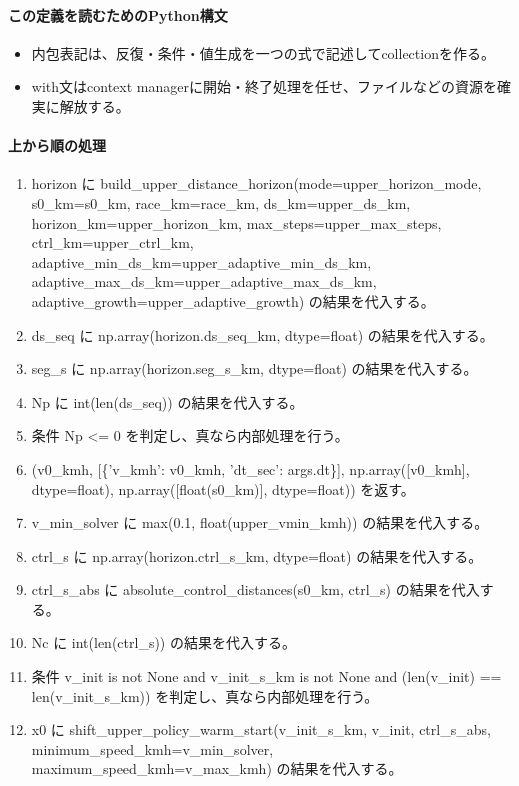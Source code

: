 \documentclass[a4paper,11pt]{article}
\begin{document}
            \paragraph{この定義を読むためのPython構文}
            \begin{itemize}[leftmargin=1.6em]
            \item 内包表記は、反復・条件・値生成を一つの式で記述してcollectionを作る。
\item with文はcontext managerに開始・終了処理を任せ、ファイルなどの資源を確実に解放する。
            \end{itemize}
            \paragraph{上から順の処理}
            \begin{enumerate}[leftmargin=1.8em]
            \item horizon に build\_upper\_distance\_horizon(mode=upper\_horizon\_mode, s0\_km=s0\_km, race\_km=race\_km, ds\_km=upper\_ds\_km, horizon\_km=upper\_horizon\_km, max\_steps=upper\_max\_steps, ctrl\_km=upper\_ctrl\_km, adaptive\_min\_ds\_km=upper\_adaptive\_min\_ds\_km, adaptive\_max\_ds\_km=upper\_adaptive\_max\_ds\_km, adaptive\_growth=upper\_adaptive\_growth) の結果を代入する。
\item ds\_seq に np.array(horizon.ds\_seq\_km, dtype=float) の結果を代入する。
\item seg\_s に np.array(horizon.seg\_s\_km, dtype=float) の結果を代入する。
\item Np に int(len(ds\_seq)) の結果を代入する。
\item 条件 Np <= 0 を判定し、真なら内部処理を行う。
\item   (v0\_kmh, [\{'v\_kmh': v0\_kmh, 'dt\_sec': args.dt\}], np.array([v0\_kmh], dtype=float), np.array([float(s0\_km)], dtype=float)) を返す。
\item v\_min\_solver に max(0.1, float(upper\_vmin\_kmh)) の結果を代入する。
\item ctrl\_s に np.array(horizon.ctrl\_s\_km, dtype=float) の結果を代入する。
\item ctrl\_s\_abs に absolute\_control\_distances(s0\_km, ctrl\_s) の結果を代入する。
\item Nc に int(len(ctrl\_s)) の結果を代入する。
\item 条件 v\_init is not None and v\_init\_s\_km is not None and (len(v\_init) == len(v\_init\_s\_km)) を判定し、真なら内部処理を行う。
\item   x0 に shift\_upper\_policy\_warm\_start(v\_init\_s\_km, v\_init, ctrl\_s\_abs, minimum\_speed\_kmh=v\_min\_solver, maximum\_speed\_kmh=v\_max\_kmh) の結果を代入する。

\end{enumerate}
\end{document}
